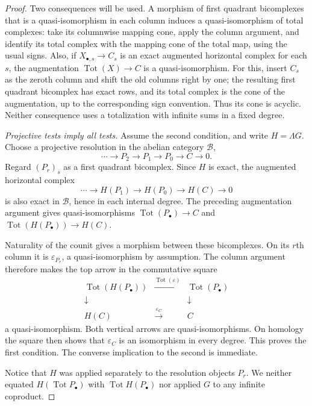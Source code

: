 \documentclass[11pt,a4paper]{article}
\theoremstyle{definition}\newtheorem{definition}[theorem]{Definition}
\theoremstyle{remark}\newtheorem{remark}[theorem]{Remark}
\begin{document}
\begin{proof}
Two consequences will be used.  A morphism of first quadrant
bicomplexes that is a quasi-isomorphism in each column induces a
quasi-isomorphism of total complexes: take its columnwise mapping
cone, apply the column argument, and identify its total complex with
the mapping cone of the total map, using the usual signs.  Also, if
$X_{\bullet,s}\to C_s$ is an exact augmented horizontal complex for
each $s$, the augmentation
$\operatorname{Tot}(X)\to C$ is a quasi-isomorphism.  For this, insert
$C_s$ as the zeroth column and shift the old columns right by one;
the resulting first quadrant bicomplex has exact rows, and its total
complex is the cone of the augmentation, up to the corresponding
sign convention.  Thus its cone is acyclic.  Neither consequence
uses a totalization with infinite sums in a fixed degree.

\emph{Projective tests imply all tests.}
Assume the second condition, and write $H=\Lambda G$.  Choose a
projective resolution in the abelian category $\mathcal B$,
\[
 \cdots\longrightarrow P_2\longrightarrow P_1
       \longrightarrow P_0\longrightarrow C\longrightarrow0 .
\]
Regard $(P_r)_s$ as a first quadrant bicomplex.  Since $H$ is exact,
the augmented horizontal complex
\[
 \cdots\longrightarrow H(P_1)\longrightarrow H(P_0)
       \longrightarrow H(C)\longrightarrow0
\]
is also exact in $\mathcal B$, hence in each internal degree.
The preceding augmentation argument gives quasi-isomorphisms
$\operatorname{Tot}(P_\bullet)\to C$ and
$\operatorname{Tot}(H(P_\bullet))\to H(C)$.

Naturality of the counit gives a morphism between these bicomplexes.
On its $r$th column it is $\varepsilon_{P_r}$, a quasi-isomorphism by
assumption. The column argument therefore makes the top arrow in
the commutative square
\[
\begin{array}{ccc}
 \operatorname{Tot}(H(P_\bullet))&
       \xrightarrow{\operatorname{Tot}(\varepsilon)}&
                         \operatorname{Tot}(P_\bullet)\\
 \downarrow&&\downarrow\\
 H(C)&\xrightarrow{\varepsilon_C}&C
\end{array}
\]
a quasi-isomorphism.  Both vertical arrows are quasi-isomorphisms.
On homology the square then shows that $\varepsilon_C$ is an
isomorphism in every degree.  This proves the first condition.  The
converse implication to the second is immediate.

Notice that $H$ was applied separately to the resolution objects
$P_r$.  We neither equated $H(\operatorname{Tot}P_\bullet)$ with
$\operatorname{Tot}H(P_\bullet)$ nor applied $G$ to any infinite
coproduct.


\end{proof}
\end{document}
